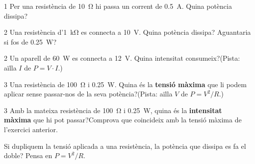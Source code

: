 \begin{exercici}{1}
Per una resistència de \SI{10}{\ohm} hi passa un corrent de \SI{0,5}{A}. Quina potència dissipa?
\end{exercici}

\begin{exercici}{2}
Una resistència d'\SI{1}{\kilo\ohm} es connecta a \SI{10}{V}. Quina potència dissipa? Aguantaria si fos de \SI{0,25}{W}?
\end{exercici}

\begin{exercici}{2}
Un aparell de \SI{60}{W} es connecta a \SI{12}{V}. Quina intensitat consumeix?\quad (Pista: aïlla $I$ de $P = V \cdot I$.)
\end{exercici}

\begin{exercici}{3}
Una resistència de \SI{100}{\ohm} i \SI{0,25}{W}. Quina és la \textbf{tensió màxima} que li podem aplicar sense passar-nos de la seva potència?\quad (Pista: aïlla $V$ de $P = V^2/R$.)
\end{exercici}

\begin{exercici}{3}
Amb la mateixa resistència de \SI{100}{\ohm} i \SI{0,25}{W}, quina és la \textbf{intensitat màxima} que hi pot passar?\quad Comprova que coincideix amb la tensió màxima de l'exercici anterior.
\end{exercici}

\begin{comprova}
Si dupliquem la tensió aplicada a una resistència, la potència que dissipa es fa el doble? Pensa en $P = V^2/R$.
\end{comprova}
